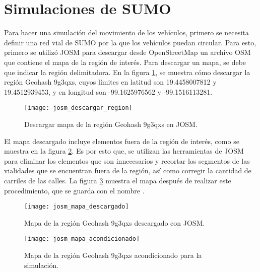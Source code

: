 \section{Simulaciones de SUMO}
\label{sec:simulaciones_sumo}

Para hacer una simulación del movimiento de los vehículos, primero se necesita
definir una red vial de SUMO por la que los vehículos puedan circular. Para
esto, primero se utilizó JOSM para descargar desde OpenStreetMap un archivo OSM
que contiene el mapa de la región de interés. Para descargar un mapa, se debe
que indicar la región delimitadora. En la figura
\ref{fig:josm_descargar_region}, se muestra cómo descargar la región Geohash
9g3qxs, cuyos límites en latitud son 19.4458007812 y 19.4512939453, y
en longitud son -99.1625976562 y -99.1516113281.

\begin{figure}[th!]
\centering
\texttt{[image: josm\_descargar\_region]}
\decoRule
\caption[Descargar mapa de la región Geohash 9g3qxs en JOSM]{Descargar mapa de
la región Geohash 9g3qxs en JOSM.}
\label{fig:josm_descargar_region}
\end{figure}

El mapa descargado incluye elementos fuera de la región de interés, como se
muestra en la figura \ref{fig:josm_mapa_descargado}. Es por esto que, se
utilizan las herramientas de JOSM para eliminar los elementos que son
innecesarios y recortar los segmentos de las vialidades que se encuentran fuera
de la región, así como corregir la cantidad de carriles de las calles. La
figura \ref{fig:josm_mapa_acondicionado} muestra el mapa después de realizar
este procedimiento, que se guarda con el nombre .

\begin{figure}[th!]
\centering
\texttt{[image: josm\_mapa\_descargado]} 
\decoRule
\caption[Mapa de la región Geohash 9g3qxs descargado con JOSM]{Mapa de la
región Geohash 9g3qxs descargado con JOSM.}
\label{fig:josm_mapa_descargado}
\end{figure}

\begin{figure}[th!]
\centering
\texttt{[image: josm\_mapa\_acondicionado]}
\decoRule
\caption[Mapa de la región Geohash 9g3qxs acondicionado para la
simulación]{Mapa de la región Geohash 9g3qxs acondicionado para la simulación.}
\label{fig:josm_mapa_acondicionado}
\end{figure}


